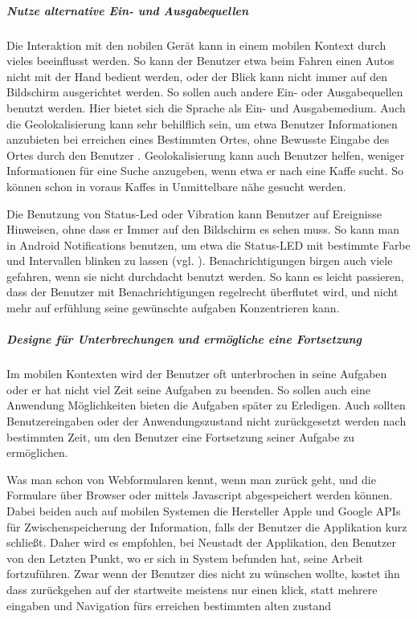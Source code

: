 \subparagraph{Nutze alternative Ein- und Ausgabequellen}
\label{subp:nutze_alternative_eingabenger_ten}

Die Interaktion mit den nobilen Gerät kann in einem mobilen Kontext durch vieles beeinflusst werden. So kann der Benutzer etwa beim Fahren einen Autos nicht mit der Hand bedient werden, oder der Blick kann nicht immer auf den Bildschirm ausgerichtet werden. So sollen auch andere Ein- oder Ausgabequellen benutzt werden. Hier bietet sich die Sprache als Ein- und Ausgabemedium.
Auch die Geolokalisierung kann sehr behilflich sein, um etwa Benutzer Informationen anzubieten bei erreichen eines Bestimmten Ortes, ohne Bewusste Eingabe des Ortes durch den Benutzer . Geolokalisierung kann auch Benutzer helfen, weniger Informationen für eine Suche anzugeben, wenn etwa er nach eine Kaffe sucht. So können schon in voraus Kaffes in Unmittelbare nähe gesucht werden.

Die Benutzung von Status-Led oder Vibration kann Benutzer auf Ereignisse Hinweisen, ohne dass er Immer auf den Bildschirm es sehen muss. So kann man in Android Notifications benutzen, um etwa die Status-LED mit bestimmte Farbe und Intervallen blinken zu lassen (vgl. \cite{androidNotApi}). Benachrichtigungen birgen auch viele gefahren, wenn sie nicht durchdacht benutzt werden. So kann es leicht passieren, dass der Benutzer mit Benachrichtigungen regelrecht überflutet wird, und nicht mehr auf erfühlung seine gewünschte aufgaben Konzentrieren kann.  

\subparagraph{Designe für Unterbrechungen und ermögliche eine Fortsetzung}
\label{subp:erm_gliche_eine_fortsetzung}

Im mobilen Kontexten wird der Benutzer oft unterbrochen in seine Aufgaben oder er hat nicht viel Zeit seine Aufgaben zu beenden. So sollen auch eine Anwendung Möglichkeiten bieten die Aufgaben später zu Erledigen. Auch sollten Benutzereingaben oder der Anwendungszustand nicht zurückgesetzt werden nach bestimmten Zeit, um den Benutzer eine Fortsetzung seiner Aufgabe zu ermöglichen.

Was man schon von Webformularen kennt, wenn man zurück geht, und die Formulare über Browser oder mittels Javascript abgespeichert werden können. 
Dabei beiden auch auf mobilen Systemen die Hersteller Apple und Google APIs für Zwischenspeicherung der Information, falls der Benutzer die Applikation kurz schließt.  Daher wird es empfohlen, bei Neustadt der Applikation, den Benutzer von den Letzten Punkt, wo er sich in System befunden hat, seine Arbeit fortzuführen. Zwar wenn der Benutzer dies nicht zu wünschen wollte, kostet ihn dass zurückgehen auf der startweite meistens nur einen klick, statt mehrere eingaben und Navigation fürs erreichen bestimmten alten zustand 

